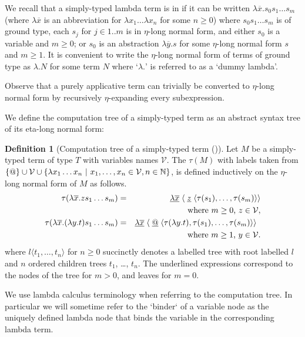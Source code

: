 \documentclass[a4paper,draft]{article}[12pt]
\theoremstyle{remark}
\theoremstyle{definition}
\newtheorem{definition}{Definition}[section]
\begin{document}
We recall that a simply-typed lambda term is in  if it can be written $\lambda \overline{x} . s_0 s_1 \ldots s_m$ (where $\lambda \overline{x}$ is an abbreviation for $\lambda x_1 \ldots \lambda x_n$ for some $n\geq 0$) where $s_0 s_1 \ldots s_m$ is of ground type, each $s_j$ for $j\in 1..m$ is in $\eta$-long normal form, and either $s_0$ is a variable and $m\geq0$; or $s_0$ is an abstraction $\lambda\overline{y}.s$ for some $\eta$-long normal form $s$ and $m\geq1$.
It is convenient to write the $\eta$-long normal form of terms of ground type as $\lambda . N$ for some term $N$ where `$\lambda.$' is referred to as a `dummy lambda'.

Observe that a purely applicative term can trivially be converted to $\eta$-long normal form by recursively $\eta$-expanding every subexpression. 

We define the computation tree of a simply-typed term as an abstract syntax tree of its eta-long normal form:
\begin{definition}[Computation tree of a simply-typed term (\cite{BlumPhd})]
	Let $M$ be a simply-typed term of type $T$ with variables names $\mathcal{V}$.
	The  $\tau(M)$ with labels taken from $ \{ @ \} \cup \mathcal{V} \cup \{ \lambda x_1 \ldots x_n \ | \ x_1 ,\ldots, x_n \in
	\mathcal{V}, n\in\mathbb{N} \}$, is defined inductively on the $\eta$-long normal form of $M$ as follows.
	\begin{eqnarray*}
		\tau(\lambda \overline{x} . z s_1 \ldots s_m) &=& \underline{\lambda \overline{x}}\; \langle\; \underline z\; \langle\tau(s_1),\ldots,\tau(s_m)\rangle\rangle\\
		&& \hbox {where $m\geq 0$, $z \in \mathcal{V}$}, \\
 \tau(\lambda \overline{x} . (\lambda y.t) s_1 \ldots s_m) &=& \underline{\lambda \overline{x}}\; \langle\; \underline @ \; \langle \tau(\lambda y.t),\tau(s_1),\ldots,\tau(s_m) \rangle \rangle \enspace\\
&&  \hbox{where $m\geq 1$, $y\in \mathcal{V}$}.
	\end{eqnarray*}
	where $l\langle t_1, \ldots, t_n \rangle$ for $n \geq 0$ succinctly denotes a labelled tree with root labelled $l$ and $n$ ordered children trees $t_1$, \ldots, $t_n$. The underlined expressions correspond to the nodes of the tree for $m>0$, and leaves for $m=0$.
\end{definition}

We use lambda calculus terminology when referring to the computation tree. In particular we will sometime refer to the `binder` of a variable node as the uniquely defined lambda node that binds the variable in the corresponding lambda term.
\end{document}
